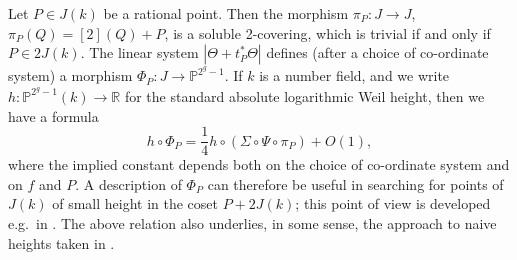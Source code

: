 \documentclass{article} %
\numberwithin{equation}{section}
\renewcommand{\P}{\mathbb{P}}
\newcommand{\R}{\mathbb{R}}
\begin{document}
Let $P \in J(k)$ be a rational point. Then the morphism $\pi_P : J \to J$, $\pi_P(Q) = [2](Q) + P$, is a soluble 2-covering, which is trivial if and only if $P \in 2J(k)$. The linear system $| \Theta + t_P^\ast \Theta|$ defines (after a choice of co-ordinate system) a morphism $\Phi_P : J \to \P^{2^g-1}$. If $k$ is a number field, and  we write $h : \P^{2^g-1}(k) \to \R$ for the standard absolute logarithmic Weil height, then we have a formula
\[ h \circ \Phi_P  = \frac{1}{4} h \circ (\Sigma \circ \Psi \circ \pi_P) + O(1), \]
where the implied constant depends both on the choice of co-ordinate system and on $f$ and $P$. A description of $\Phi_P$ can therefore be useful in searching for points of $J(k)$ of small height in the coset $P + 2 J(k)$; this point of view is developed e.g.\ in  \cite{Fis12}. The above relation also underlies, in some sense, the approach to naive heights taken in \cite{lagathorne2024smallheightoddhyperelliptic}. 
\end{document}
